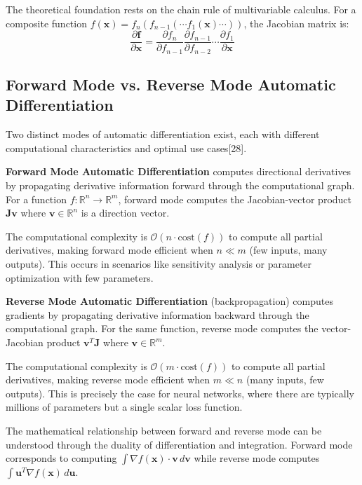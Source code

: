 \documentclass[11pt,a4paper]{report}
\begin{document}
The theoretical foundation rests on the chain rule of multivariable calculus. For a composite function $f(\mathbf{x}) = f_n(f_{n-1}(\cdots f_1(\mathbf{x}) \cdots))$, the Jacobian matrix is:
\begin{equation}
\frac{\partial \mathbf{f}}{\partial \mathbf{x}} = \frac{\partial f_n}{\partial f_{n-1}} \frac{\partial f_{n-1}}{\partial f_{n-2}} \cdots \frac{\partial f_1}{\partial \mathbf{x}}
\end{equation}

\subsection{Forward Mode vs. Reverse Mode Automatic Differentiation}

Two distinct modes of automatic differentiation exist, each with different computational characteristics and optimal use cases[28].

\textbf{Forward Mode Automatic Differentiation} computes directional derivatives by propagating derivative information forward through the computational graph. For a function $f: \mathbb{R}^n \rightarrow \mathbb{R}^m$, forward mode computes the Jacobian-vector product $\mathbf{J}\mathbf{v}$ where $\mathbf{v} \in \mathbb{R}^n$ is a direction vector.

The computational complexity is $\mathcal{O}(n \cdot \text{cost}(f))$ to compute all partial derivatives, making forward mode efficient when $n \ll m$ (few inputs, many outputs). This occurs in scenarios like sensitivity analysis or parameter optimization with few parameters.

\textbf{Reverse Mode Automatic Differentiation} (backpropagation) computes gradients by propagating derivative information backward through the computational graph. For the same function, reverse mode computes the vector-Jacobian product $\mathbf{v}^T\mathbf{J}$ where $\mathbf{v} \in \mathbb{R}^m$.

The computational complexity is $\mathcal{O}(m \cdot \text{cost}(f))$ to compute all partial derivatives, making reverse mode efficient when $m \ll n$ (many inputs, few outputs). This is precisely the case for neural networks, where there are typically millions of parameters but a single scalar loss function.

The mathematical relationship between forward and reverse mode can be understood through the duality of differentiation and integration. Forward mode corresponds to computing $\int \nabla f(\mathbf{x}) \cdot \mathbf{v} \, d\mathbf{v}$ while reverse mode computes $\int \mathbf{u}^T \nabla f(\mathbf{x}) \, d\mathbf{u}$.
\end{document}
